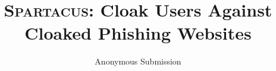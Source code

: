 \documentclass[conference]{IEEEtran}
\newcommand{\crawlphish}{{CrawlPhish}\xspace}
\newcommand{\spartacus}{{\textsc{Spartacus}}\xspace}
\begin{document}



\title{\spartacus: Cloak Users Against Cloaked Phishing Websites}

\author{Anonymous Submission}


\maketitle

\thispagestyle{plain}
\pagestyle{plain}



\begin{abstract}
	
\end{abstract}
















% 
\end{document}

